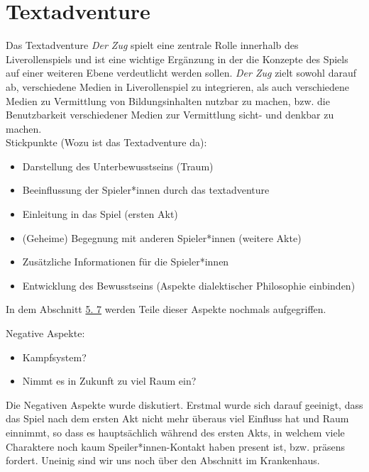 \documentclass[a4paper, 12pt]{scrartcl}
\begin{document}
    \section{Textadventure} \label{textadventure} 
    Das Textadventure \textit{Der Zug} spielt eine zentrale Rolle innerhalb des Liverollenspiels und ist eine wichtige Ergänzung in der die Konzepte des Spiels auf einer weiteren Ebene verdeutlicht werden sollen. 
    \textit{Der Zug} zielt sowohl darauf ab, verschiedene Medien in Liverollenspiel zu integrieren, als auch verschiedene Medien zu Vermittlung von Bildungsinhalten nutzbar zu machen, bzw. die Benutzbarkeit verschiedener Medien zur Vermittlung sicht- und denkbar zu machen.\\
    Stickpunkte (Wozu ist das Textadventure da):
    \begin{itemize}
    \item Darstellung des Unterbewusstseins (Traum)
    \item Beeinflussung der Spieler*innen durch das textadventure
    \item Einleitung in das Spiel (ersten Akt)
    \item (Geheime) Begegnung mit anderen Spieler*innen (weitere Akte)
    \item Zusätzliche Informationen für die Spieler*innen
    \item Entwicklung des Bewusstseins (Aspekte dialektischer Philosophie einbinden)
    \end{itemize}
    In dem Abschnitt \hyperref[txtad-anlehnung]{5. 7} werden Teile dieser Aspekte nochmals aufgegriffen.

    Negative Aspekte:
    \begin{itemize}
    \item Kampfsystem?
    \item Nimmt es in Zukunft zu viel Raum ein? 
    \end{itemize}
    Die Negativen Aspekte wurde diskutiert.
    Erstmal wurde sich darauf geeinigt, dass das Spiel nach dem ersten Akt nicht mehr überaus viel Einfluss hat und Raum einnimmt, so dass es hauptsächlich während des ersten Akts, in welchem viele Charaktere noch kaum Speiler*innen-Kontakt haben present ist, bzw. präsens fordert.
    Uneinig sind wir uns noch über den Abschnitt im Krankenhaus.\\
\end{document}
